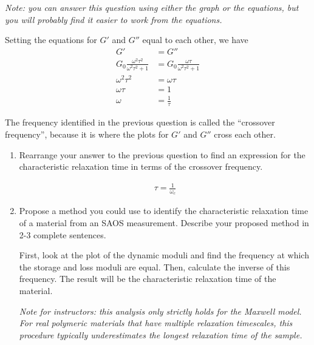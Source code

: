 \begin{activity}
\begin{ctqs}
		\emph{Note: you can answer this question using either the graph or the equations, but you will probably find it easier to work from the equations.}
	
					\begin{solution}[1.75in]
					
						Setting the equations for $G'$ and $G''$ equal to each other, we have
						\begin{align*}
							G' &= G''\\
							G_0 \frac{\omega^2 \tau^2}{\omega^2 \tau^2 + 1} &= G_0 \frac{\omega \tau}{\omega^2 \tau^2 + 1}\\
							\omega^2 \tau^2 &= \omega \tau\\
							\omega\tau &= 1\\
							\omega &= \frac{1}{\tau}
						\end{align*}
					\end{solution}
	
	\question The frequency identified in the previous question is called the ``crossover frequency'', because it is where the plots for $G'$ and $G''$ cross each other.
	
		\begin{enumerate}
			\item Rearrange your answer to the previous question to find an expression for the characteristic relaxation time in terms of the crossover frequency.
	
					\begin{solution}[1in]
					
						\begin{align*}
							\tau = \frac{1}{\omega_c}
						\end{align*}
					\end{solution}
					
			\item Propose a method you could use to identify the characteristic relaxation time of a material from an SAOS measurement.  Describe your proposed method in 2-3 complete sentences.
			
				\begin{solution}[2.5in]
					First, look at the plot of the dynamic moduli and find the frequency at which the storage and loss moduli are equal.					
					Then, calculate the inverse of this frequency.  The result will be the characteristic relaxation time of the material.
					
					\emph{Note for instructors: this analysis only strictly holds for the Maxwell model.  For real polymeric materials that have multiple relaxation timescales, this procedure typically \emph{underestimates} the longest relaxation time of the sample.}
				\end{solution}
			

\end{enumerate}
\end{ctqs}
\end{activity}
